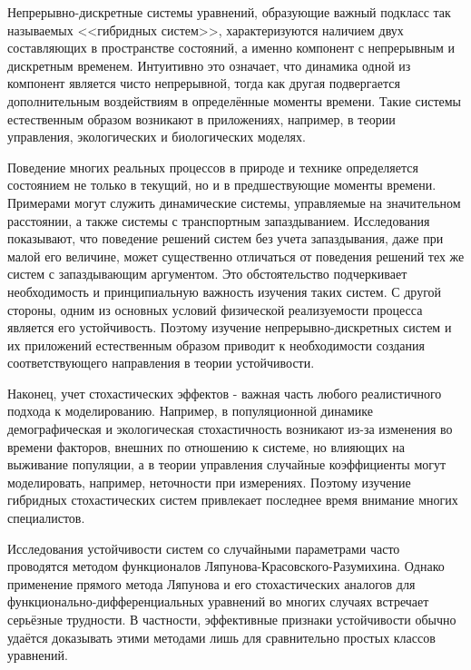 Непрерывно-дискретные системы уравнений, образующие важный подкласс так называемых <<гибридных систем>>, характеризуются наличием двух составляющих в пространстве состояний, а именно компонент с непрерывным и дискретным временем. Интуитивно
это означает, что динамика одной из компонент является чисто
непрерывной, тогда как другая подвергается дополнительным
воздействиям в определённые моменты времени. Такие системы
естественным образом возникают в приложениях, например, в теории
управления, экологических   и биологических моделях.

Поведение многих реальных процессов в природе и технике определяется
состоянием не только в текущий, но и в предшествующие моменты
времени. Примерами могут служить динамические системы, управляемые
на значительном расстоянии, а также системы с транспортным
запаздыванием. Исследования показывают, что поведение решений систем
без учета запаздывания, даже при малой его величине, может
существенно отличаться от поведения решений тех же систем с
запаздывающим аргументом. Это обстоятельство подчеркивает
необходимость и принципиальную важность изучения таких систем. С
другой стороны, одним из основных условий физической реализуемости
процесса является его устойчивость. Поэтому изучение непрерывно-дискретных
систем и их приложений естественным образом приводит к необходимости
создания соответствующего направления в теории устойчивости.

Наконец, учет стохастических эффектов - важная часть любого
реалистичного подхода к моделированию. Например, в популяционной
динамике демографическая и экологическая стохастичность возникают
из-за изменения во времени факторов, внешних по отношению к системе,
но влияющих на выживание популяции, а в теории управления случайные
коэффициенты могут моделировать, например, неточности при
измерениях. Поэтому изучение гибридных стохастических систем
привлекает последнее время внимание многих специалистов.

Исследования устойчивости систем со случайными параметрами часто
проводятся методом функционалов Ляпунова-Красовского-Разумихина.
Однако применение прямого метода Ляпунова и его стохастических
аналогов для функцио\-нально-диф\-фе\-рен\-ци\-аль\-ных уравнений во
многих случаях встречает серьёзные трудности. В частности,
эффективные признаки устойчивости обычно удаётся доказывать этими
методами лишь для сравнительно простых классов уравнений.

